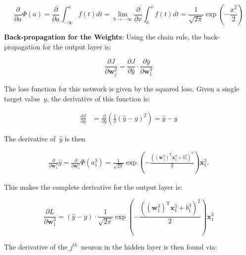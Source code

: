 \documentclass{report}
\newcommand{\w}{\mathbf{w}}
\newcommand{\xvec}{\mathbf{x}}
\newcommand{\yhat}{\hat{y}}
\newcommand{\T}{\text{T}}
\begin{document}
  \begin{equation}
    \frac{\partial}{\partial a} \Phi(a) = \frac{\partial}{\partial a} \int_{-\infty}^{a}f(t)dt =\underset{b\rightarrow -\infty}\lim \frac{\partial}{\partial x} \int_{b}^{x}f(t)dt=\frac{1}{\sqrt{2\pi}} \exp\left( -\frac{x^{2}}{2} \right)
  \end{equation}
  
  \textbf{Back-propagation for the Weights}: Using the chain rule, the back-propagation for the output layer is:
  
  \begin{equation}
    \frac{\partial J}{\partial \w_{j}^{2}} = \frac{\partial J}{\partial \yhat} \cdot \frac{\partial \yhat}{\partial \w_{1}^{3}}  
  \end{equation}
  
  The loss function for this network is given by the squared loss.  Given a single target value~$y$, the derivative of this function is:
  
  \begin{align}
    \frac{\partial J}{\partial \yhat} &= \frac{\partial}{\partial \yhat} \left(\frac{1}{2} \left( \yhat - y\right)^2 \right) = \yhat - y \label{eq:derivLoss}
  \end{align}
  
  The derivative of~$\yhat$ is then
  
  \begin{align}
    \frac{\partial}{\partial \w_{1}^{3}} \yhat = \frac{\partial}{\partial \w_{1}^{3}}\Phi(a_{1}^{3})=\frac{1}{\sqrt{2\pi}} \exp\left( -\frac{\left(\left(\w_{1}^{3}\right)^\T\xvec_{1}^{3}+b_{1}^{3}\right)^{2}}{2} \right)\xvec_{1}^{3}\textrm{.}
  \end{align}
  
  This makes the complete derivative for the output layer is:
  
  \begin{equation}
    \frac{\partial L}{\partial \w_{1}^{3}} = \boxed{\left( \yhat - y \right) \cdot \frac{1}{\sqrt{2\pi}} \exp\left( -\frac{\left(\left(\w_{1}^{3}\right)^\T\xvec_{1}^{3}+b_{1}^{3}\right)^{2}}{2} \right)\xvec_{1}^{3}} \label{eq:outputLayerDerivative}
  \end{equation}
    
  The derivative of the $j^{th}$~neuron in the hidden layer is then found via:
  
\end{document}
